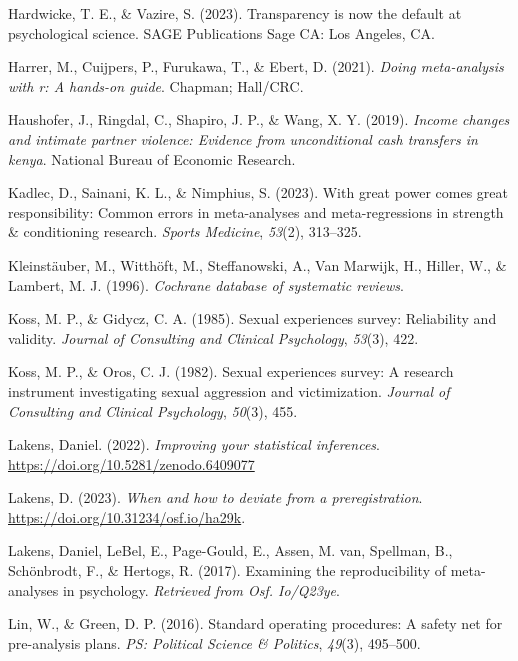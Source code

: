 \documentclass[
  ,jou]{apa6}
\newlength{\cslhangindent}
\newenvironment{CSLReferences}[2] %
 {\begin{list}{}{%
  \setlength{\itemindent}{0pt}
  \setlength{\leftmargin}{0pt}
  \setlength{\parsep}{0pt}
  \ifodd #1
   \setlength{\leftmargin}{\cslhangindent}
   \setlength{\itemindent}{-1\cslhangindent}
  \fi
  \setlength{\itemsep}{#2\baselineskip}}}
 {\end{list}}
\begin{document}
\begin{CSLReferences}{1}{0}
Hardwicke, T. E., \& Vazire, S. (2023). Transparency is now the default at psychological science. SAGE Publications Sage CA: Los Angeles, CA.

Harrer, M., Cuijpers, P., Furukawa, T., \& Ebert, D. (2021). \emph{Doing meta-analysis with r: A hands-on guide}. Chapman; Hall/CRC.

Haushofer, J., Ringdal, C., Shapiro, J. P., \& Wang, X. Y. (2019). \emph{Income changes and intimate partner violence: Evidence from unconditional cash transfers in kenya}. National Bureau of Economic Research.

Kadlec, D., Sainani, K. L., \& Nimphius, S. (2023). With great power comes great responsibility: Common errors in meta-analyses and meta-regressions in strength \& conditioning research. \emph{Sports Medicine}, \emph{53}(2), 313--325.

Kleinstäuber, M., Witthöft, M., Steffanowski, A., Van Marwijk, H., Hiller, W., \& Lambert, M. J. (1996). \emph{Cochrane database of systematic reviews}.

Koss, M. P., \& Gidycz, C. A. (1985). Sexual experiences survey: Reliability and validity. \emph{Journal of Consulting and Clinical Psychology}, \emph{53}(3), 422.

Koss, M. P., \& Oros, C. J. (1982). Sexual experiences survey: A research instrument investigating sexual aggression and victimization. \emph{Journal of Consulting and Clinical Psychology}, \emph{50}(3), 455.

Lakens, Daniel. (2022). \emph{Improving your statistical inferences}. \url{https://doi.org/10.5281/zenodo.6409077}

Lakens, D. (2023). \emph{When and how to deviate from a preregistration}. \url{https://doi.org/10.31234/osf.io/ha29k}.

Lakens, Daniel, LeBel, E., Page-Gould, E., Assen, M. van, Spellman, B., Schönbrodt, F., \& Hertogs, R. (2017). Examining the reproducibility of meta-analyses in psychology. \emph{Retrieved from Osf. Io/Q23ye}.

Lin, W., \& Green, D. P. (2016). Standard operating procedures: A safety net for pre-analysis plans. \emph{PS: Political Science \& Politics}, \emph{49}(3), 495--500.


\end{CSLReferences}
\end{document}

